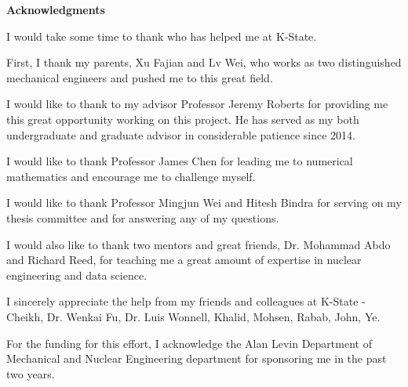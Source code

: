 
\newpage
\vspace*{0.9cm}
\begin{center}
{\bf \Huge Acknowledgments}
\end{center}

\setlength{\baselineskip}{0.8cm}


I would take some time to thank who has helped me at K-State.

First, I thank my parents, Xu Fajian and Lv Wei, who works as two distinguished mechanical engineers and pushed me to this great field.

I would like to thank to my advisor Professor Jeremy Roberts for providing me this great opportunity working on this project. He has served as my both undergraduate and graduate advisor in considerable patience since 2014.

I would like to thank Professor James Chen for leading me to numerical mathematics and encourage me to challenge myself.   

I would like to thank Professor Mingjun Wei and Hitesh Bindra for serving on my thesis committee and for answering any of my questions.

I would also like to thank two mentors and great friends, Dr. Mohammad Abdo and Richard Reed, for teaching me a great amount of expertise in nuclear engineering and data science.

I sincerely appreciate the help from my friends and colleagues at K-State - Cheikh, Dr. Wenkai Fu, Dr. Luis Wonnell, Khalid, Mohsen, Rabab, John, Ye.

For the funding for this effort, I acknowledge the Alan Levin Department of Mechanical and Nuclear Engineering department for sponsoring me in the past two years. 